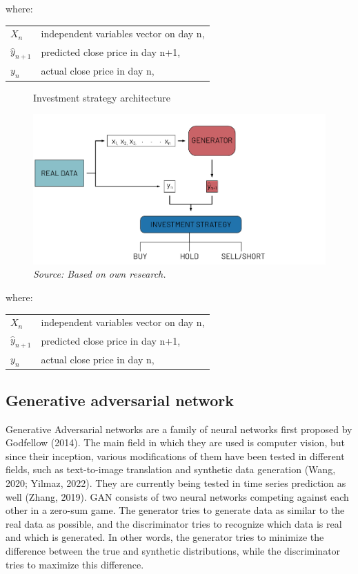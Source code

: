 \documentclass[11pt]{article} %
\makeatletter
\newenvironment{conditions}
  {\par\vspace{\abovedisplayskip}\noindent\begin{tabular}{>{$}l<{$} @{${}={}$} l}}
  {\end{tabular}\par\vspace{\belowdisplayskip}}
\makeatother
\begin{document}
\noindent where:
\begin{conditions}
X_n & independent variables vector on day n, \\ 
 \hat{y}_{n+1}     &   predicted close price in day n+1,\\
 y_{n}     &  actual close price  in day n,\\   
\end{conditions}

\begin{figure}[H]
\caption{Investment strategy architecture}
\includegraphics{rysunek2.png}
\caption*{\textit{Source: Based on own research.}}
\end{figure}
\noindent where:
\begin{conditions}
X_n & independent variables vector on day n, \\ 
 \hat{y}_{n+1}     &   predicted close price in day n+1,\\
 y_{n}     &  actual close price  in day n,\\   
\end{conditions}

\subsection{Generative adversarial network}

Generative Adversarial networks are a family of neural networks first proposed by Godfellow (2014). The main field in which they are used is computer vision, but since their inception, various modifications of them have been tested in different fields, such as text-to-image translation and synthetic data generation (Wang, 2020; Yilmaz, 2022). They are currently being tested in time series prediction as well (Zhang, 2019).  GAN consists of two neural networks competing against each other in a zero-sum game. The generator tries to generate data as similar to the real data as possible, and the discriminator tries to recognize which data is real and which is generated. In other words, the generator tries to minimize the difference between the true and synthetic distributions, while the discriminator tries to maximize this difference. 
\end{document}
